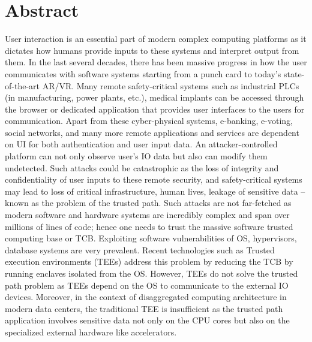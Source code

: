 \begingroup
\let\clearpage\relax
\let\cleardoublepage\relax
\let\cleardoublepage\relax

\chapter*{Abstract}

User interaction is an essential part of modern complex computing platforms as it dictates how humans provide inputs to these systems and interpret output from them. In the last several decades, there has been massive progress in how the user communicates with software systems starting from a punch card to today's state-of-the-art AR/VR. 
Many remote safety-critical systems such as industrial PLCs (in manufacturing, power plants, etc.), medical implants can be accessed through the browser or dedicated application that provides user interfaces to the users for communication. Apart from these cyber-physical systems, e-banking, e-voting, social networks, and many more remote applications and services are dependent on UI for both authentication and user input data. An attacker-controlled platform can not only observe user's IO data but also can modify them undetected. Such attacks could be catastrophic as the loss of integrity and confidentiality of user inputs to these remote security, and safety-critical systems may lead to loss of critical infrastructure, human lives, leakage of sensitive data -- known as the problem of the trusted path. Such attacks are not far-fetched as modern software and hardware systems are incredibly complex and span over millions of lines of code; hence one needs to trust the massive software trusted computing base or TCB. Exploiting software vulnerabilities of OS, hypervisors, database systems are very prevalent. Recent technologies such as Trusted execution environments (TEEs) address this problem by reducing the TCB by running enclaves isolated from the OS. However, TEEs do not solve the trusted path problem as TEEs depend on the OS to communicate to the external IO devices. Moreover, in the context of disaggregated computing architecture in modern data centers, the traditional TEE is insufficient as the trusted path application involves sensitive data not only on the CPU cores but also on the specialized external hardware like accelerators.


